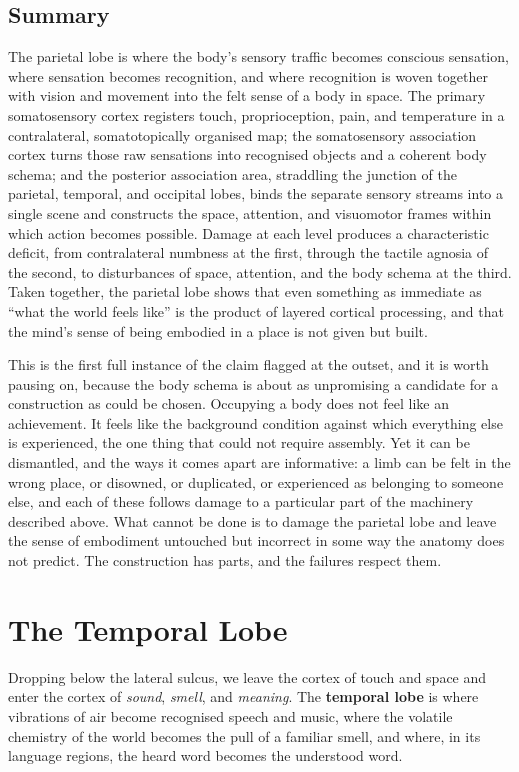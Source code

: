 \documentclass[11pt]{article}
\begin{document}
\subsection{Summary}

The parietal lobe is where the body's sensory traffic becomes conscious sensation, where sensation becomes recognition, and where recognition is woven together with vision and movement into the felt sense of a body in space. The primary somatosensory cortex registers touch, proprioception, pain, and temperature in a contralateral, somatotopically organised map; the somatosensory association cortex turns those raw sensations into recognised objects and a coherent body schema; and the posterior association area, straddling the junction of the parietal, temporal, and occipital lobes, binds the separate sensory streams into a single scene and constructs the space, attention, and visuomotor frames within which action becomes possible. Damage at each level produces a characteristic deficit, from contralateral numbness at the first, through the tactile agnosia of the second, to disturbances of space, attention, and the body schema at the third. Taken together, the parietal lobe shows that even something as immediate as ``what the world feels like'' is the product of layered cortical processing, and that the mind's sense of being embodied in a place is not given but built.

This is the first full instance of the claim flagged at the outset, and it is worth pausing on, because the body schema is about as unpromising a candidate for a construction as could be chosen. Occupying a body does not feel like an achievement. It feels like the background condition against which everything else is experienced, the one thing that could not require assembly. Yet it can be dismantled, and the ways it comes apart are informative: a limb can be felt in the wrong place, or disowned, or duplicated, or experienced as belonging to someone else, and each of these follows damage to a particular part of the machinery described above. What cannot be done is to damage the parietal lobe and leave the sense of embodiment untouched but incorrect in some way the anatomy does not predict. The construction has parts, and the failures respect them.


\section{The Temporal Lobe}

Dropping below the lateral sulcus, we leave the cortex of touch and space and enter the cortex of \textit{sound}, \textit{smell}, and \textit{meaning}. The \textbf{temporal lobe} is where vibrations of air become recognised speech and music, where the volatile chemistry of the world becomes the pull of a familiar smell, and where, in its language regions, the heard word becomes the understood word.
\end{document}
